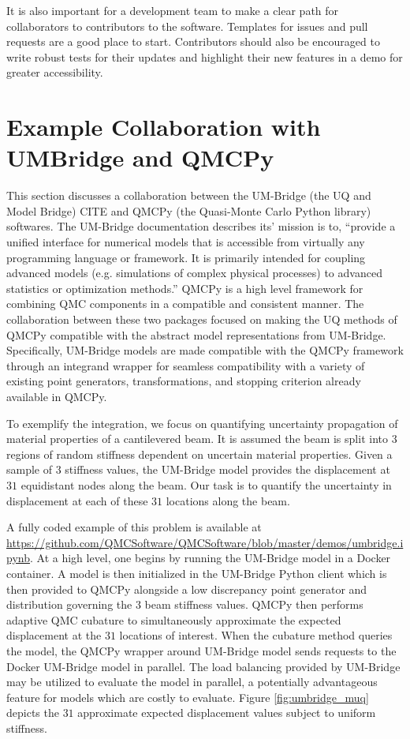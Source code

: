\documentclass[graybox]{svmult}
\newcommand{\AGSComment}[1]{{\color{red} #1}}
\begin{document}
It is also important for a development team to make a clear path for collaborators to contributors to the software. Templates for issues and pull requests are a good place to start. Contributors should also be encouraged to write robust tests for their updates and highlight their new features in a demo for greater accessibility.

\section{Example Collaboration with UMBridge and QMCPy} \label{CDHS_sec:example_collaboration_umbridge}

This section discusses a collaboration between the UM-Bridge (the UQ and Model Bridge) \AGSComment{CITE} and QMCPy (the Quasi-Monte Carlo Python library) \cite{QMCPy2020a} softwares. The UM-Bridge documentation describes its' mission is to, ``provide a unified interface for numerical models that is accessible from virtually any programming language or framework. It is primarily intended for coupling advanced models (e.g. simulations of complex physical processes) to advanced statistics or optimization methods.'' QMCPy is a high level framework for combining QMC components in a compatible and consistent manner. The collaboration between these two packages focused on making the UQ methods of QMCPy compatible with the abstract model representations from UM-Bridge. Specifically, UM-Bridge models are made compatible with the QMCPy framework through an integrand wrapper for seamless compatibility with a variety of existing point generators, transformations, and stopping criterion already available in QMCPy.

To exemplify the integration, we focus on quantifying uncertainty propagation of material properties of a cantilevered beam. It is assumed the beam is split into $3$ regions of random stiffness dependent on uncertain material properties. Given a sample of $3$ stiffness values, the UM-Bridge model provides the displacement at $31$ equidistant nodes along the beam. Our task is to quantify the uncertainty in displacement at each of these $31$ locations along the beam.

A fully coded example of this problem is available at \url{https://github.com/QMCSoftware/QMCSoftware/blob/master/demos/umbridge.ipynb}. At a high level, one begins by running the UM-Bridge model in a Docker container. A model is then initialized in the UM-Bridge Python client which is then provided to QMCPy alongside a low discrepancy point generator and distribution governing the $3$ beam stiffness values. QMCPy then performs adaptive QMC cubature to simultaneously approximate the expected displacement at the $31$ locations of interest. When the cubature method queries the model, the QMCPy wrapper around UM-Bridge model sends requests to the Docker UM-Bridge model in parallel. The load balancing provided by UM-Bridge may be utilized to evaluate the model in parallel, a potentially advantageous feature for models which are costly to evaluate. Figure \ref{fig:umbridge_muq} depicts the $31$ approximate expected displacement values subject to uniform stiffness.
\end{document}
